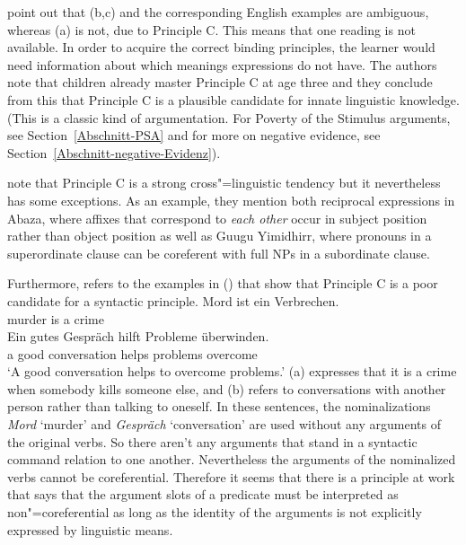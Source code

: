 \citet*[]{CTK2009a} point out that (b,c) and the corresponding English examples are ambiguous, whereas
(a) is not, due to Principle C. This means that one reading is not available. In order to acquire the correct binding principles,
the learner would need information about which meanings expressions do not have. The authors note that children already master Principle C
at age three and they conclude from this that Principle C is a plausible candidate for innate linguistic knowledge. (This is a classic kind of argumentation.
For Poverty of the Stimulus arguments, see Section~\ref{Abschnitt-PSA} and for more on negative evidence, see Section~\ref{Abschnitt-negative-Evidenz}).

\citet[]{EL2009b} note that Principle C is a strong cross"=linguistic tendency but
it nevertheless has some exceptions. As an example, they mention both reciprocal expressions
in Abaza, where affixes that correspond to \emph{each other} occur in subject position rather than object position as well as Guugu Yimidhirr, where
pronouns in a superordinate clause can be coreferent with full NPs in a subordinate clause.

Furthermore, \citet[]{Fanselow92b} refers to the examples in () that show that Principle C is a poor candidate for a syntactic
principle.
\eal
\ex 
\gll Mord ist ein Verbrechen.\\
     murder is a crime\\
\ex 
\gll Ein gutes Gespräch hilft Probleme überwinden.\\
     a good conversation helps problems overcome\\
\glt `A good conversation helps to overcome problems.'
\zl
(a) expresses that it is a crime when somebody kills someone else, and (b) refers to conversations with another
person rather than talking to oneself. In these sentences, the nominalizations \emph{Mord} `murder'
and \emph{Gespräch} `conversation' are used without any arguments of the original verbs. So there
aren't any arguments that stand in a syntactic command relation to one another. Nevertheless the arguments
of the nominalized verbs cannot be coreferential. Therefore it seems that there is a principle at work that says that
the argument slots of a predicate must be interpreted as non"=coreferential as long as the identity of the arguments is not explicitly expressed
by linguistic means.

